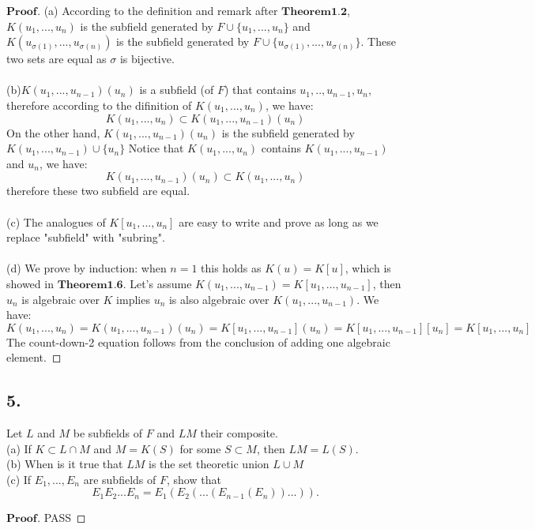 \documentclass[a4paper, 11pt]{article}
\newenvironment{myprf}
{\renewcommand\qedsymbol{$ $}\begin{proof}[$\textbf{Proof}$]}
  {\end{proof}}
\begin{document}
\begin{myprf}
        \noindent
        (a) According to the definition and remark after $\textbf{Theorem1.2}$, 
        $K(u_1,...,u_n)$ is the subfield generated by $F\cup \{u_1,...,u_n\}$ and 
        $K(u_{\sigma(1)},...,u_{\sigma(n)})$ is the subfield generated by $F\cup
        \{u_{\sigma(1)},...,u_{\sigma(n)}\}$. These two sets are equal as $\sigma$ is 
        bijective.\\
        \\
        (b)$K(u_1,...,u_{n-1})(u_n)$ is a subfield (of $F$) that contains $u_1,..,u_{n-1}
        ,u_n$, therefore according to the difinition of $K(u_1,...,u_n)$, we have:
        $$
        K(u_1,...,u_n)\subset K(u_1,...,u_{n-1})(u_n)
        $$
        On the other hand, $K(u_1,...,u_{n-1})(u_n)$ is the subfield generated by 
        $K(u_1,...,u_{n-1})\cup \{u_n\}$ Notice that $K(u_1,...,u_n)$ contains 
        $K(u_1,...,u_{n-1})$ and $u_n$, we have:
        $$
        K(u_1,...,u_{n-1})(u_n)\subset K(u_1,...,u_n)
        $$ therefore these two subfield are equal.\\
        \\
        (c) The analogues of $K[u_1,...,u_n]$ are easy to write and prove as long as 
        we replace "subfield"  with "subring".\\
        \\
        (d) We prove by induction: when $n=1$ this holds as $K(u)=K[u]$, which is showed  
        in $\textbf{Theorem1.6}$. Let's assume $K(u_1,...,u_{n-1})=K[u_1,...,u_{n-1}]$,
        then $u_n$ is algebraic over $K$ implies $u_n$ is also algebraic over
        $K(u_1,...,u_{n-1})$. We have:
        $$
        K(u_1,...,u_n)=K(u_1,...,u_{n-1})(u_n)=K[u_1,...,u_{n-1}](u_n)=K[u_1,...,u_{n-1}][u_n]=K[u_1,...,u_n]
        $$ The count-down-2 equation follows from the conclusion of adding one algebraic 
        element.
\end{myprf}

\subsection*{5.}
\noindent
Let $L$ and $M$ be subfields of $F$ and $LM$ their composite.\\
\indent (a) If $K\subset L\cap M$ and $M=K(S)$ for some $S\subset M$, then $LM=L(S)$.\\
\indent (b) When is it true that $LM$ is the set theoretic union $L\cup M$\\
\indent (c) If $E_1,...,E_n$ are subfields of $F$, show that
$$
E_{1}E_{2}...E_{n}=E_1(E_2(...(E_{n-1}(E_{n}))...)).
$$
\begin{myprf}
       PASS
\end{myprf}
        
\end{document}
